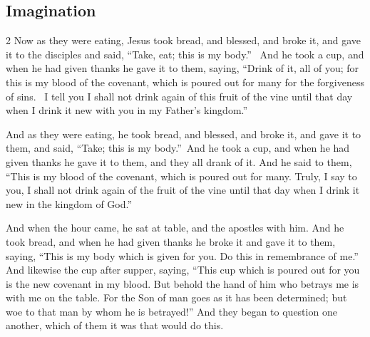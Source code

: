 \subsection{Imagination}
\begin{multicols}{2}\small
Now as they were eating, Jesus took bread, and blessed, and broke it, and gave it to the disciples and said,
“Take, eat; this is my body.”  And he took a cup, and when he had given thanks he gave it to them, saying, “Drink of it,
all of you; for this is my blood of the covenant, which is poured out for many for the forgiveness of sins.  I tell you
I shall not drink again of this fruit of the vine until that day when I drink it new with you in my
Father's kingdom.” 

And as they were eating, he took bread, and blessed, and broke it, and gave it to them, and said, “Take; this is
my body.” And he took a cup, and when he had given thanks he gave it to them, and they all drank of it. And he said to
them, “This is my blood of the covenant, which is poured out for many. Truly, I say to you, I shall not drink again of
the fruit of the vine until that day when I drink it new in the kingdom of God.”  

And when the hour came, he sat at table, and the apostles with him. And he took bread, and when he had given
thanks he broke it and gave it to them, saying, “This is my body which is given for you. Do this in remembrance of me.”
And likewise the cup after supper, saying, “This cup which is poured out for you is the new covenant in my blood. But
behold the hand of him who betrays me is with me on the table. For the Son of man goes as it has been determined; but
woe to that man by whom he is betrayed!” And they began to question one another, which of them it was that would do
this.  
\end{multicols}

